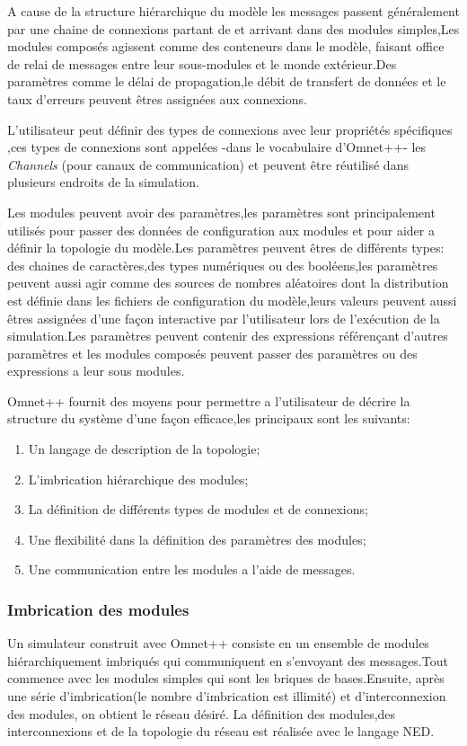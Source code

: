 A cause de la structure hiérarchique du modèle les messages passent généralement par une chaine de connexions partant de et arrivant dans des modules simples,Les modules composés agissent comme des conteneurs dans le modèle, faisant office de relai de messages entre leur sous-modules et le monde extérieur.Des paramètres comme le délai de propagation,le débit de transfert de données et le taux d'erreurs peuvent êtres assignées aux connexions.

L'utilisateur peut définir des types de connexions avec leur propriétés spécifiques ,ces types de connexions sont appelées -dans le vocabulaire d'Omnet++- les \emph{Channels} (pour canaux de communication)  et peuvent être réutilisé dans plusieurs endroits de la simulation.

Les modules peuvent avoir des paramètres,les paramètres sont principalement utilisés pour passer des données de configuration aux modules et pour aider a définir la topologie du modèle.Les paramètres peuvent êtres  de différents types: des chaines de caractères,des types numériques ou des booléens,les paramètres peuvent aussi agir comme des sources de nombres aléatoires dont la distribution est définie dans les fichiers de configuration du modèle,leurs valeurs peuvent aussi êtres assignées d'une façon interactive par l'utilisateur lors de l'exécution de la simulation.Les paramètres peuvent  contenir des expressions référençant d'autres paramètres et les modules composés peuvent passer des paramètres ou des expressions a leur sous modules.

Omnet++ fournit des moyens  pour permettre a l'utilisateur de décrire  la structure du système d'une façon efficace,les principaux sont les suivants:

\begin{enumerate}
\item Un langage de description de la topologie;
\item L'imbrication hiérarchique des modules;
\item La définition de différents types de modules et de connexions;
\item Une flexibilité dans la définition des paramètres des modules;
\item Une communication entre les modules a l'aide de messages.
\end{enumerate}

\subsubsection{Imbrication des modules}
Un simulateur construit avec Omnet++ consiste en un ensemble de modules hiérarchiquement imbriqués qui communiquent en s'envoyant des messages.Tout commence avec les modules simples qui sont les briques de bases.Ensuite, après une série  d'imbrication(le nombre d'imbrication est illimité) et d'interconnexion des modules, on obtient le réseau désiré.
La définition des modules,des interconnexions et de la topologie du réseau est réalisée avec le langage NED.

